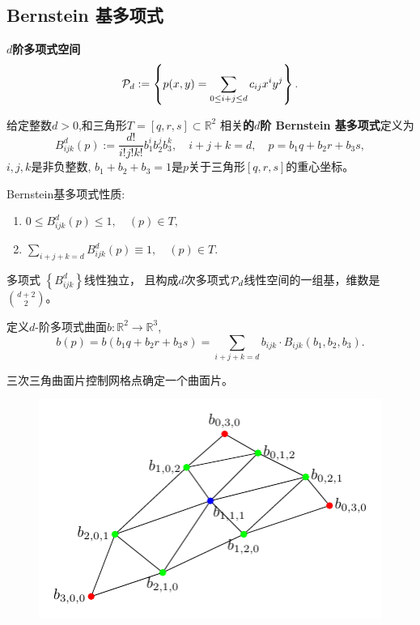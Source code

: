 \subsection{Bernstein 基多项式}
\begin{nota}
  $d$\textbf{阶多项式空间}
  \begin{displaymath}
{\cal P}_d:=\left\{ p(x,y) = \sum_{0\leq i+j\leq d}c_{ij}x^iy^j\right\}.
  \end{displaymath}
\end{nota}

\begin{defn}
  给定整数$d>0$,和三角形$T=[q,r,s]\subset \mathbb{R}^2$
  相关\textbf{的$d$阶 Bernstein 基多项式}定义为
  \begin{displaymath}
    B^d_{ijk}(p):=\frac{d!}{i!j!k!}b^i_1b_2^jb_3^k,\quad i+j+k=d,
    \quad p=b_1q+b_2r+b_3s,
  \end{displaymath}
  $i,j,k$是非负整数, $b_1+b_2+b_3=1$是$p$关于三角形$[q,r,s]$的重心坐标。
\end{defn}

\begin{prop}
  Bernstein基多项式性质:
  \begin{enumerate}
  \item $ 0\leq B_{ijk}^d(p)\leq 1,\quad (p) \in T,$
  \item $ \sum_{i+j+k=d}B_{ijk}^d(p) \equiv 1,\quad (p)\in T.$
  \end{enumerate}
\end{prop}

\begin{lem}
  多项式 $\left\{ B^d_{ijk}\right\}$线性独立，
  且构成$d$次多项式${\cal P}_d$线性空间的一组基，维数是
  $\binom{d+2}{2}$。
\end{lem}

\begin{defn}[Bézier曲面片或三角曲面片]
  定义$d$-阶多项式曲面$b:\mathbb{R}^2\rightarrow \mathbb{R}^3$,
  \begin{equation}
    b(p)=b(b_1q+b_2r+b_3s)
    = \sum_{i+j+k=d}b_{ijk}\cdot B_{ijk}(b_1,b_2,b_3).
  \end{equation}
\end{defn}
\begin{rem}
  三次三角曲面片控制网格点确定一个曲面片。
  \begin{figure}[H]
    \centering
    \includegraphics[width=0.3\linewidth]{tikz/controlNet}
    \label{fig:controlnet}
  \end{figure}
\end{rem}

